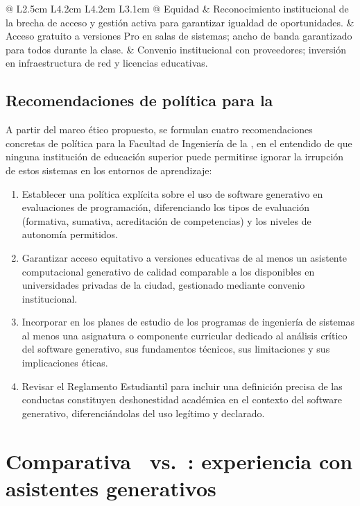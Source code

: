 \begin{longtable}{@{} L{2.5cm} L{4.2cm} L{4.2cm} L{3.1cm} @{} }
	Equidad & 
	Reconocimiento institucional de la brecha de acceso y gestión activa para garantizar igualdad de oportunidades. & 
	Acceso gratuito a versiones Pro en salas de sistemas; ancho de banda garantizado para todos durante la clase. & 
	Convenio institucional con proveedores; inversión en infraestructura de red y licencias educativas. \\
\end{longtable}
\endgroup

\subsection{Recomendaciones de política para la \ud}
\label{subsec:recomendaciones-politica}

A partir del marco ético propuesto, se formulan cuatro recomendaciones concretas
de política para la Facultad de Ingeniería de la \ud, en el entendido de que
ninguna institución de educación superior puede permitirse ignorar la irrupción
de estos sistemas en los entornos de aprendizaje:

\begin{enumerate}[label=\arabic*.]
  \item Establecer una política explícita sobre el uso de software generativo
        en evaluaciones de programación, diferenciando los tipos de evaluación
        (formativa, sumativa, acreditación de competencias) y los niveles de
        autonomía permitidos.
  \item Garantizar acceso equitativo a versiones educativas de al menos un
        asistente computacional generativo de calidad comparable a los disponibles
        en universidades privadas de la ciudad, gestionado mediante convenio
        institucional.
  \item Incorporar en los planes de estudio de los programas de ingeniería
        de sistemas al menos una asignatura o componente curricular dedicado al
        análisis crítico del software generativo, sus fundamentos técnicos,
        sus limitaciones y sus implicaciones éticas.
  \item Revisar el Reglamento Estudiantil para incluir una definición precisa
        de las conductas constituyen deshonestidad académica en el contexto
        del software generativo, diferenciándolas del uso legítimo y declarado.
\end{enumerate}

\section{Comparativa \java\ vs.\ \rust: experiencia con asistentes generativos}
\label{sec:java-rust-generativo}

